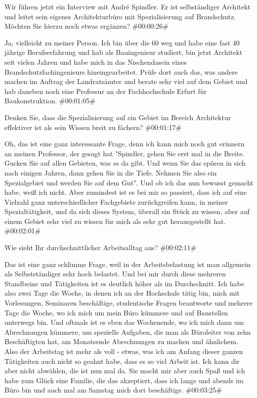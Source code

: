 \documentclass[a4paper, 12pt]{scrartcl}
\begin{document}
\begin{description}

\Fabian Wir führen jetzt ein Interview mit André Spindler. Er ist selbständiger Architekt und leitet sein eigenes Architekturbüro mit Spezialisierung auf Brandschutz. Möchten Sie hierzu noch etwas ergänzen? \#00:00:26\#

\Andre Ja, vielleicht zu meiner Person. Ich bin über die 60 weg und habe eine fast 40 jährige Berufserfahrung und hab als Bauingenieur studiert, bin jetzt Architekt seit vielen Jahren und habe mich in das Nischendasein eines Brandschutzfachingenieurs hineingearbeitet. Prüfe dort auch das, was andere machen im Auftrag der Landratsämter und berate sehr viel auf dem Gebiet und hab daneben noch eine Professur an der Fachhochschule Erfurt für Baukonstruktion. \#00:01:05\#

\Fabian Denken Sie, dass die Spezialisierung auf ein Gebiet im Bereich Architektur effektiver ist als sein Wissen breit zu fächern? \#00:01:17\#

\Andre Oh, das ist eine ganz interessante Frage, denn ich kann mich noch gut erinnern an meinen Professor, der gesagt hat "Spindler, gehen Sie erst mal in die Breite. Gucken Sie auf allen Gebieten, was es da gibt. Und wenn Sie das spüren in sich nach einigen Jahren, dann gehen Sie in die Tiefe. Nehmen Sie also ein Spezialgebiet und werden Sie auf dem Gut". Und ob ich das nun bewusst gemacht habe, weiß ich nicht. Aber zumindest ist es bei mir so passiert, dass ich auf eine Vielzahl ganz unterschiedlicher Fachgebiete zurückgreifen kann, in meiner Spezialtätigkeit, und da sich dieses System, überall ein Stück zu wissen, aber auf einem Gebiet sehr viel zu wissen für mich als sehr gut herausgestellt hat. \#00:02:01\#

\Fabian Wie sieht Ihr durchschnittlicher Arbeitsalltag aus? \#00:02:11\#

\Andre Das ist eine ganz schlimme Frage, weil in der Arbeitsbelastung ist man allgemein als Selbstständiger sehr hoch belastet. Und bei mir durch diese mehreren Standbeine und Tätigkeiten ist es deutlich höher als im Durchschnitt. Ich habe also zwei Tage die Woche, in denen ich an der Hochschule tätig bin, mich mit Vorlesungen, Seminaren beschäftige, studentische Fragen beantworte und mehrere Tage die Woche, wo ich mich um mein Büro kümmere und auf Baustellen unterwegs bin. Und oftmals ist es eben das Wochenende, wo ich mich dann um Abrechnungen kümmere, um spezielle Aufgaben, die man als Büroleiter von zehn Beschäftigten hat, am Monatsende Abrechnungen zu machen und ähnlichem. Also der Arbeitstag ist mehr als voll - etwas, was ich am Anfang dieser ganzen Tätigkeiten auch nicht so geahnt habe, dass es so viel Arbeit ist. Ich kann dir aber nicht abwählen, die ist nun mal da. Sie macht mir aber auch Spaß und ich habe zum Glück eine Familie, die das akzeptiert, dass ich lange und abends im Büro bin und auch mal am Samstag mich dort beschäftige. \#00:03:25\#


\end{description}
\end{document}
